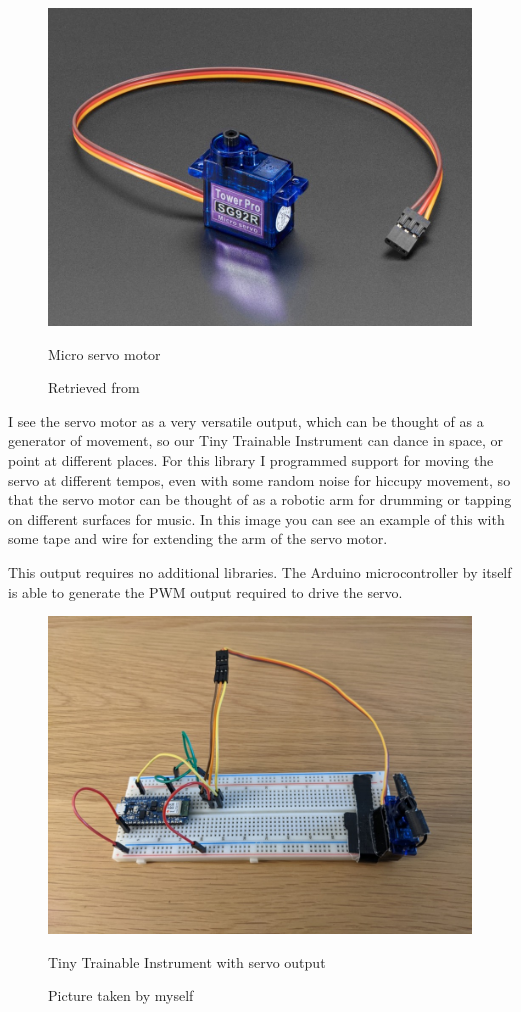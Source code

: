 \begin{figure}[ht]
  \centering
  \includegraphics[width=0.75\linewidth,height=0.25\textheight,keepaspectratio]{images/materials-adafruit-servo.jpg}
  \caption{Micro servo motor}
  \caption*{Retrieved from \cite{website-materials-adafruit-servo}}
  \label{fig:materials-adafruit-servo}
\end{figure}

I see the servo motor as a very versatile output, which can be thought of as a generator of movement, so our Tiny Trainable Instrument can dance in space, or point at different places. For this library I programmed support for moving the servo at different tempos, even with some random noise for hiccupy movement, so that the servo motor can be thought of as a robotic arm for drumming or tapping on different surfaces for music. In this image you can see an example of this with some tape and wire for extending the arm of the servo motor.

This output requires no additional libraries. The Arduino microcontroller by itself is able to generate the \acrfull{PWM} output required to drive the servo.

\begin{figure}[ht]
  \centering
  \includegraphics[width=0.75\linewidth,height=0.25\textheight,keepaspectratio]{images/output-servo.jpg}
  \caption{Tiny Trainable Instrument with servo output}
  \caption*{Picture taken by myself}
  \label{fig:output-servo}
\end{figure}


